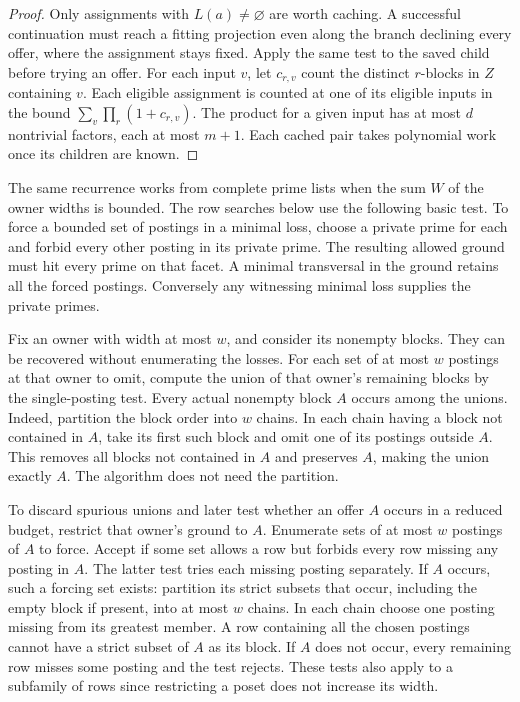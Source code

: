 \begin{proof}
Only assignments with $L(a)\ne\varnothing$ are worth caching.
A successful continuation must reach a fitting projection
even along the branch declining every offer, where the assignment
stays fixed. Apply the same test to the saved child before trying
an offer. For each input $v$, let $c_{r,v}$ count the distinct
$r$-blocks in $Z$ containing $v$. Each eligible assignment is
counted at one of its eligible inputs in the bound
$\sum_v\prod_r(1+c_{r,v})$. The product for a given input has
at most $d$ nontrivial factors, each at most $m+1$. Each
cached pair takes polynomial work once its children are known.
\end{proof}

The same recurrence works from complete prime lists
when the sum $W$ of the owner widths is bounded.
The row searches below use the following basic test.
To force a bounded set of postings in a minimal loss,
choose a private prime for each and forbid every other
posting in its private prime. The resulting allowed
ground must hit every prime on that facet. A minimal
transversal in the ground retains all the forced
postings. Conversely any witnessing minimal loss
supplies the private primes.

Fix an owner with width at most $w$, and consider
its nonempty blocks. They can be recovered without
enumerating the losses. For each set of at most $w$
postings at that owner to omit, compute the union of
that owner's remaining blocks by the single-posting
test. Every actual nonempty block $A$ occurs among
the unions. Indeed, partition the block order into
$w$ chains. In each chain having a block not contained
in $A$, take its first such block and omit one of its
postings outside $A$. This removes all blocks not
contained in $A$ and preserves $A$, making the union
exactly $A$. The algorithm does not need the partition.

To discard spurious unions and later test whether an
offer $A$ occurs in a reduced budget, restrict that
owner's ground to $A$. Enumerate sets of at most $w$
postings of $A$ to force. Accept if some set allows a
row but forbids every row missing any posting in $A$.
The latter test tries each missing posting separately.
If $A$ occurs, such a forcing set exists: partition its
strict subsets that occur, including the empty block
if present, into at most $w$ chains. In each chain choose one posting
missing from its greatest member. A row containing
all the chosen postings cannot have a strict subset
of $A$ as its block. If $A$ does not occur, every
remaining row misses some posting and the test
rejects. These tests also apply to a subfamily of
rows since restricting a poset does not increase its
width.


